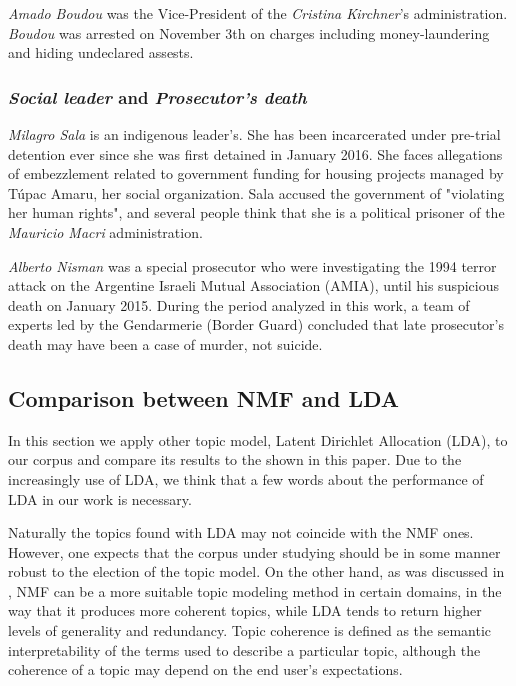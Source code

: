 \documentclass[a4paper, 12pt]{article}
\begin{document}
\par \emph{Amado Boudou} was the Vice-President of the \emph{Cristina Kirchner}'s administration.
\emph{Boudou} was arrested on November 3th on charges including money-laundering and hiding undeclared assests.

\subsubsection{\emph{Social leader} and \emph{Prosecutor's death}}

\par \emph{Milagro Sala} is an indigenous leader’s. 
She has been incarcerated under pre-trial detention ever since she was first detained in January 2016. She faces allegations of embezzlement related to government funding for housing projects managed by Túpac Amaru, her social organization.
Sala accused the government of "violating her human rights", and several people think that she is a political prisoner of the \emph{Mauricio Macri} administration.

\par \emph{Alberto Nisman} was a special prosecutor who were investigating the 1994 terror attack on the Argentine Israeli Mutual Association (AMIA), until his suspicious death on January 2015.
During the period analyzed in this work, a team of experts led by the Gendarmerie (Border Guard) concluded that late prosecutor's death may have been a case of murder, not suicide.


\subsection{Comparison between NMF and LDA}

\par In this section we apply other topic model, Latent Dirichlet Allocation \cite{blei2003latent} (LDA), to our corpus and compare its results to the shown in this paper. Due to the increasingly use of LDA, we think that a few words about the performance of LDA in our work is necessary. 

\par Naturally the topics found with LDA may not coincide with the NMF ones.
However, one expects that the corpus under studying should be in some manner robust to the election of the topic model.
On the other hand, as was discussed in \cite{o2015analysis}, NMF can be a more suitable topic modeling method in certain domains, in the way that it produces more coherent topics, while LDA tends to return higher levels of generality and redundancy. Topic coherence is defined as the semantic interpretability of the terms used to describe a particular topic, although the coherence of a topic may depend on the end user's expectations.
\end{document}
